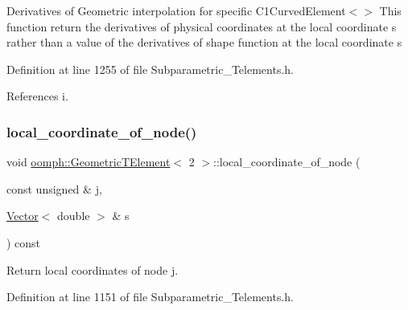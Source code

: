 Derivatives of Geometric interpolation for specific C1\+Curved\+Element$<$$>$ This function return the derivatives of physical coordinates at the local coordinate s rather than a value of the derivatives of shape function at the local coordinate s 

Definition at line 1255 of file Subparametric\+\_\+\+Telements.\+h.



References i.

\mbox{\label{classoomph_1_1GeometricTElement_3_012_01_4_aeabbac1b1c1fe3019eee0040f162990e}} 
\subsubsection{\texorpdfstring{local\+\_\+coordinate\+\_\+of\+\_\+node()}{local\_coordinate\_of\_node()}}
{\footnotesize\ttfamily void \hyperlink{classoomph_1_1GeometricTElement}{oomph\+::\+Geometric\+T\+Element}$<$ 2 $>$\+::local\+\_\+coordinate\+\_\+of\+\_\+node (\begin{DoxyParamCaption}\item[{const unsigned \&}]{j,  }\item[{\hyperlink{classoomph_1_1Vector}{Vector}$<$ double $>$ \&}]{s }\end{DoxyParamCaption}) const\hspace{0.3cm}{\ttfamily [inline]}}



Return local coordinates of node j. 



Definition at line 1151 of file Subparametric\+\_\+\+Telements.\+h.

\mbox{\label{classoomph_1_1GeometricTElement_3_012_01_4_a8e6bab8c2bd951889894b3a08b796207}} 
